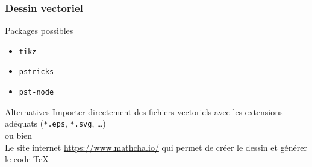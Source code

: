 \begin{frame}[containsverbatim]
    \frametitle{Dessin vectoriel}
    \begin{alertblock}{Packages possibles}
        \begin{itemize}[label=$\triangleright$]
            \item \texttt{tikz}
            \item \texttt{pstricks}
            \item \texttt{pst-node}
        \end{itemize}
    \end{alertblock}
    \begin{alertblock}{Alternatives}
        Importer directement des fichiers vectoriels avec les extensions adéquats (\texttt{*.eps}, \texttt{*.svg}, \dots) \\
        ou bien \\
        Le site internet \href{https://www.mathcha.io/}{https://www.mathcha.io/} qui permet de créer le dessin et générer le code TeX
    \end{alertblock}
\end{frame}
